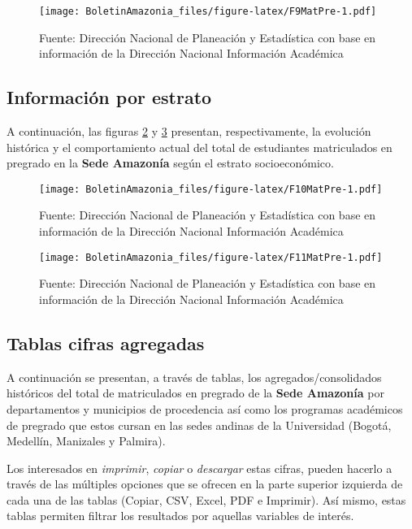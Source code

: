 \documentclass[
]{book}
\begin{document}
\begin{figure}
\centering
\texttt{[image: BoletinAmazonia\_files/figure-latex/F9MatPre-1.pdf]}
\caption{\label{fig:F9MatPre}Fuente: Dirección Nacional de Planeación y Estadística con base en información de la Dirección Nacional Información Académica}
\end{figure}

\hypertarget{informaciuxf3n-por-estrato}{%
\subsection{Información por estrato}\label{informaciuxf3n-por-estrato}}

A continuación, las figuras \ref{fig:F10MatPre} y \ref{fig:F11MatPre} presentan, respectivamente, la evolución histórica y el comportamiento actual del total de estudiantes matriculados en pregrado en la \textbf{Sede Amazonía} según el estrato socioeconómico.

\begin{figure}
\centering
\texttt{[image: BoletinAmazonia\_files/figure-latex/F10MatPre-1.pdf]}
\caption{\label{fig:F10MatPre}Fuente: Dirección Nacional de Planeación y Estadística con base en información de la Dirección Nacional Información Académica}
\end{figure}

\begin{figure}
\centering
\texttt{[image: BoletinAmazonia\_files/figure-latex/F11MatPre-1.pdf]}
\caption{\label{fig:F11MatPre}Fuente: Dirección Nacional de Planeación y Estadística con base en información de la Dirección Nacional Información Académica}
\end{figure}

\hypertarget{tablas-cifras-agregadas-4}{%
\subsection{Tablas cifras agregadas}\label{tablas-cifras-agregadas-4}}

A continuación se presentan, a través de tablas, los agregados/consolidados históricos del total de matriculados en pregrado de la \textbf{Sede Amazonía} por departamentos y municipios de procedencia así como los programas académicos de pregrado que estos cursan en las sedes andinas de la Universidad (Bogotá, Medellín, Manizales y Palmira).

Los interesados en \emph{imprimir}, \emph{copiar} o \emph{descargar} estas cifras, pueden hacerlo a través de las múltiples opciones que se ofrecen en la parte superior izquierda de cada una de las tablas (Copiar, CSV, Excel, PDF e Imprimir). Así mismo, estas tablas permiten filtrar los resultados por aquellas variables de interés.
\end{document}

